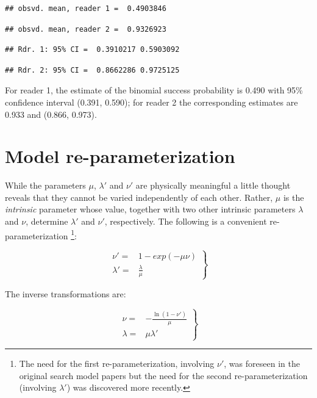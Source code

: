 \documentclass[
]{book}
\begin{document}
\begin{verbatim}
## obsvd. mean, reader 1 =  0.4903846
\end{verbatim}

\begin{verbatim}
## obsvd. mean, reader 2 =  0.9326923
\end{verbatim}

\begin{verbatim}
## Rdr. 1: 95% CI =  0.3910217 0.5903092
\end{verbatim}

\begin{verbatim}
## Rdr. 2: 95% CI =  0.8662286 0.9725125
\end{verbatim}

For reader 1, the estimate of the binomial success probability is 0.490 with 95\% confidence interval (0.391, 0.590); for reader 2 the corresponding estimates are 0.933 and (0.866, 0.973).

\hypertarget{rsm-re-parameterization}{%
\section{Model re-parameterization}\label{rsm-re-parameterization}}

While the parameters \(\mu\), \(\lambda'\) and \(\nu'\) are physically meaningful a little thought reveals that they cannot be varied independently of each other. Rather, \(\mu\) is the \emph{intrinsic} parameter whose value, together with two other intrinsic parameters \(\lambda\) and \(\nu\), determine \(\lambda'\) and \(\nu'\), respectively. The following is a convenient re-parameterization \footnote{The need for the first re-parameterization, involving \(\nu'\), was foreseen in the original search model papers \citep{chakraborty2006search, chakraborty2006roc} but the need for the second re-parameterization (involving \(\lambda'\)) was discovered more recently.}:

\begin{equation}
\left. 
\begin{aligned}
\nu' =& 1 - exp\left ( - \mu \nu \right ) \\
\lambda' =& \frac{\lambda}{\mu}
\end{aligned}
\right \}
\label{eq:rsm-transform}
\end{equation}

The inverse transformations are:

\begin{equation}
\left. 
\begin{aligned}
\nu =& - \frac{\ln \left ( 1-\nu' \right )}{\mu}\\
\lambda =& \mu \lambda' 
\end{aligned}
\right \}
\label{eq:rsm-inv-transform}
\end{equation}
\end{document}
